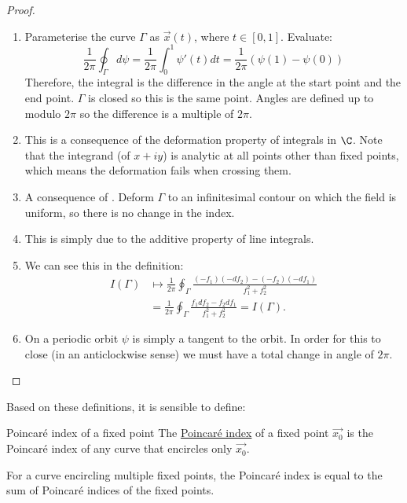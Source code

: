 \documentclass[../Main.tex]{subfiles}
\begin{document}
\begin{proof}
    \begin{enumerate}
        \item Parameterise the curve $\Gamma$ as $\vec{x}(t)$, where $t \in [0, 1]$. Evaluate:
            \begin{equation*}
                \frac1{2\pi} \oint_\Gamma d\psi = \frac1{2\pi} \int_{0}^{1} \psi'(t) dt = \frac1{2\pi} \left(\psi(1) - \psi(0)\right)
            \end{equation*}
            Therefore, the integral is the difference in the angle at the start point and the end point. $\Gamma$ is closed so this is the same point. Angles are defined up to modulo $2\pi$ so the difference is a multiple of $2\pi$.
        \item This is a consequence of the deformation property of integrals in $\C$. Note that the integrand (of $x + iy$) is analytic at all points other than fixed points, which means the deformation fails when crossing them.
        \item A consequence of . Deform $\Gamma$ to an infinitesimal contour on which the field is uniform, so there is no change in the index.
        \item This is simply due to the additive property of line integrals.
        \item We can see this in the definition:
            \begin{align*}
                I(\Gamma) &\mapsto \frac1{2\pi} \oint_\Gamma \frac{(-f_1) (-df_2) - (-f_2) (-df_1)}{f_1^2 + f_2^2} \\
                &= \frac1{2\pi} \oint_\Gamma \frac{f_1 df_2 - f_2 df_1}{f_1^2 + f_2^2} = I(\Gamma).
            \end{align*}
        \item On a periodic orbit $\psi$ is simply a tangent to the orbit. In order for this to close (in an anticlockwise sense) we must have a total change in angle of $2\pi$.
    \end{enumerate}
\end{proof}
Based on these definitions, it is sensible to define:
\begin{definition}{Poincaré index of a fixed point}
    The \underline{Poincaré index} of a fixed point $\vec{x_0}$ is the Poincaré index of any curve that encircles only $\vec{x_0}$.
\end{definition}
\begin{proposition}
    For a curve encircling multiple fixed points, the Poincaré index is equal to the sum of Poincaré indices of the fixed points.
    \label{propPoincIndxManyPts}
\end{proposition}
\end{document}
